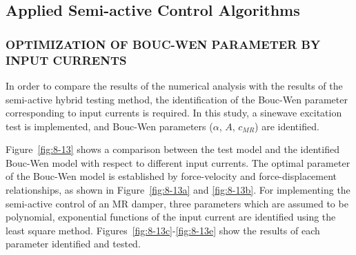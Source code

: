 \subsection{Applied Semi-active Control Algorithms}
\subsubsection{OPTIMIZATION OF BOUC-WEN PARAMETER BY INPUT CURRENTS}

In order to compare the results of the numerical analysis with the results of the semi-active hybrid testing method, the identification of the Bouc-Wen parameter corresponding to input currents is required. In this study, a sinewave excitation test is implemented, and Bouc-Wen parameters ($\alpha$, $A$, $c_{MR}$) are identified.

Figure~\ref{fig:8-13} shows a comparison between the test model and the identified Bouc-Wen model with respect to different input currents. The optimal parameter of the Bouc-Wen model is established by force-velocity and force-displacement relationships, as shown in Figure~\ref{fig:8-13a} and \ref{fig:8-13b}. For implementing the semi-active control of an MR damper, three parameters which are assumed to be polynomial, exponential functions of the input current are identified using the least square method. Figures~\ref{fig:8-13c}-\ref{fig:8-13e} show the results of each parameter identified and tested.

